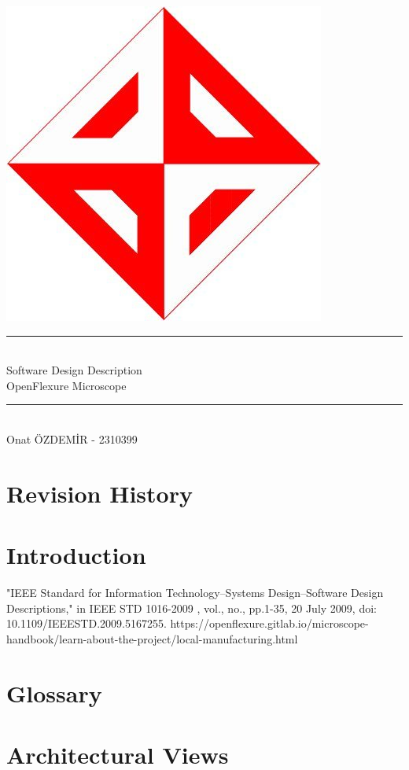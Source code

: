 \documentclass[12pt]{article}
\begin{document}
	\begin{titlepage}
		\newcommand{\HRule}{\rule{\linewidth}{0.1mm}} 
		\center 
		\includegraphics[scale=0.12]{ceng} \\[1cm]
		\HRule \\[0.5cm]
		{ \huge Software Design Description }\\[0.4cm]
		{\Large OpenFlexure Microscope} \\
		
		\HRule \\[2cm]
		
				
		{\large Onat ÖZDEMİR - 2310399} \\

	\end{titlepage}
	
	\begingroup
	\hypersetup{hidelinks}
	\tableofcontents
	\newpage
	\listoffigures
	\newpage
	\listoftables
	\newpage
	\endgroup
	
	
	\section*{Revision History}
	
	\newpage
	
	\section{Introduction}
	

	\begin{thebibliography}{2}
		"IEEE Standard for Information Technology--Systems Design--Software Design Descriptions," in IEEE STD 1016-2009 , vol., no., pp.1-35, 20 July 2009, doi: 10.1109/IEEESTD.2009.5167255.
		 https://openflexure.gitlab.io/microscope-handbook/learn-about-the-project/local-manufacturing.html
	\end{thebibliography}

	\newpage
	
	\section{Glossary}
	
	
	\section{Architectural Views}
	
	
	
	
	
	
\end{document}
